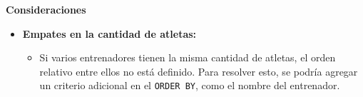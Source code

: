 \textbf{Consideraciones}

\begin{itemize}
   
   \item \textbf{Empates en la cantidad de atletas:}
   \begin{itemize}
       \item Si varios entrenadores tienen la misma cantidad de atletas, el orden relativo entre ellos no está definido. Para resolver esto, se podría agregar un criterio adicional en el \texttt{ORDER BY}, como el nombre del entrenador.
   \end{itemize}
\end{itemize}
